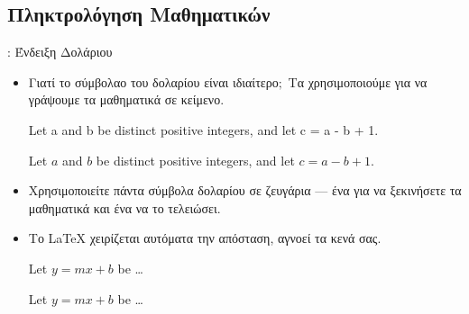 \documentclass{beamer}
\begin{document}
\subsection{Πληκτρολόγηση Μαθηματικών}
\begin{frame}[fragile]{\insertsubsection{}: Ένδειξη Δολάριου}
\begin{itemize}
\item Γιατί το σύμβολαο του δολαρίου \keystrokett{\$} είναι ιδιαίτερο$;$ Τα χρησιμοποιούμε για να γράψουμε τα μαθηματικά σε κείμενο.\\[1ex]
\en
\begin{exampletwouptiny}
Let a and b be distinct positive
integers, and let c = a - b + 1.

Let $a$ and $b$ be distinct positive
integers, and let $c = a - b + 1$.
\end{exampletwouptiny}
\gr
\item Χρησιμοποιείτε πάντα σύμβολα δολαρίου σε ζευγάρια --- ένα για να ξεκινήσετε τα μαθηματικά και ένα
να το τελειώσει.
\item Το \LaTeX{} χειρίζεται αυτόματα την απόσταση, αγνοεί τα κενά σας.
\en
\begin{exampletwouptiny}
Let $y=mx+b$ be \ldots

Let $y = m x + b$ be \ldots
\end{exampletwouptiny}
\end{itemize}
\end{frame}
\gr
\end{document}
